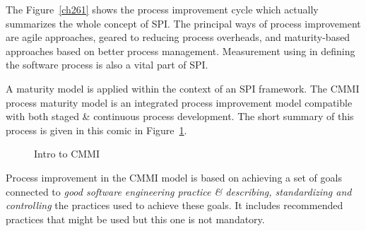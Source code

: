 \documentclass[dvips,12pt]{article}
\begin{document}
The Figure~\ref{ch261} shows the process improvement cycle which actually summarizes the whole concept of SPI. The principal ways of process improvement are agile approaches, geared to reducing process overheads, and maturity-based approaches based on better process management. Measurement using in defining the software process is also a vital part of SPI. 

A maturity model is applied within the context of an SPI framework. The CMMI process maturity model is an integrated process improvement model compatible with both staged \& continuous process development. The short summary of this process is given in this comic in Figure~\ref{comic}.
\begin{figure}[t]
\begin{center}
\end{center} 
\caption{Intro to CMMI\label{comic}}
\end{figure}

Process improvement in the CMMI model is based on achieving a set of goals connected to \emph{good software engineering practice \& describing, standardizing and controlling} the practices used to achieve these goals. It includes recommended practices that might be used but this one is not mandatory.
\end{document}
